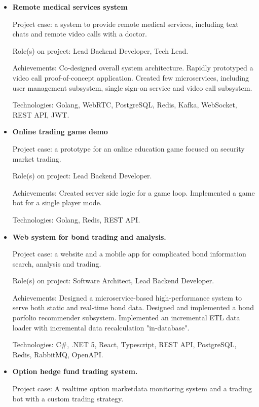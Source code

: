 \documentclass{article}
\begin{document}
\begin{itemize}
    \item {
        \textbf{Remote medical services system}
        
        Project case: a system to provide remote medical services, including text chats and remote video calls with a doctor.
        
        Role(s) on project: Lead Backend Developer, Tech Lead.
        
        Achievements:
        Co-designed overall system architecture.
        Rapidly prototyped a video call proof-of-concept application.
        Created few microservices, including user management subsystem, single sign-on service and video call subsystem.
        
        Technologies: Golang, WebRTC, PostgreSQL, Redis, Kafka, WebSocket, REST API, JWT.
    }
    \item {
        \textbf{Online trading game demo}
        
        Project case: a prototype for an online education game focused on security market trading.
        
        Role(s) on project: Lead Backend Developer.
        
        Achievements:
        Created server side logic for a game loop.
        Implemented a game bot for a single player mode.
        
        Technologies: Golang, Redis, REST API.
    }
    \item {
        \textbf{Web system for bond trading and analysis.}
        
        Project case: a website and a mobile app for complicated bond information search, analysis and trading.
        
        Role(s) on project: Software Architect, Lead Backend Developer.
        
        Achievements:
        Designed a microservice-based high-performance system to serve both static and real-time bond data.
        Designed and implemented a bond porfolio recommender subsystem.
        Implemented an incremental ETL data loader with incremental data recalculation "in-database".
        
        Technologies: C\#, .NET 5, React, Typescript, REST API, PostgreSQL, Redis, RabbitMQ, OpenAPI.
    }
    \item {
        \textbf{Option hedge fund trading system.}
        
        Project case: A realtime option marketdata monitoring system and a trading bot with a custom trading strategy.
        
}
\end{itemize}
\end{document}
